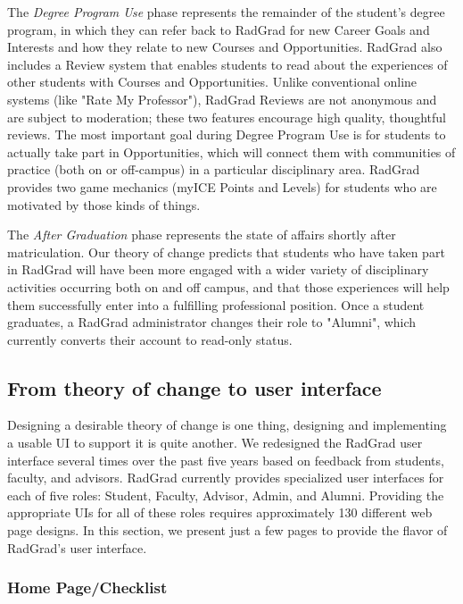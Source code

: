 \documentclass[acmsmall]{acmart}
\begin{document}
The {\em Degree Program Use} phase represents the remainder of the student's degree program, in which they can refer back to RadGrad for new Career Goals and Interests and how they relate to new Courses and Opportunities. RadGrad also includes a Review system that enables students to read about the experiences of other students with Courses and Opportunities. Unlike conventional online systems (like "Rate My Professor"), RadGrad Reviews are not anonymous and are subject to moderation; these two features encourage high quality, thoughtful reviews.  The most important goal during Degree Program Use is for students to actually take part in Opportunities, which will connect them with communities of practice (both on or off-campus) in a particular disciplinary area. RadGrad provides two game mechanics (myICE Points and Levels) for students who are motivated by those kinds of things.

The {\em After Graduation} phase represents the state of affairs shortly after matriculation.  Our theory of change predicts that students who have taken part in RadGrad will have been more engaged with a wider variety of disciplinary activities occurring both on and off campus, and that those experiences will help them successfully enter into a fulfilling professional position. Once a student graduates, a RadGrad administrator changes their role to "Alumni", which currently converts their account to read-only status.

\subsection{From theory of change to user interface}

Designing a desirable theory of change is one thing, designing and implementing a usable UI to support it is quite another. We redesigned the RadGrad user interface several times over the past five years based on feedback from students, faculty, and advisors.  RadGrad currently provides specialized user interfaces for each of five roles: Student, Faculty, Advisor, Admin, and Alumni. Providing the appropriate UIs for all of these roles requires approximately 130 different web page designs. In this section, we present just a few pages to provide the flavor of RadGrad's user interface.

\subsubsection{Home Page/Checklist}
\end{document}
